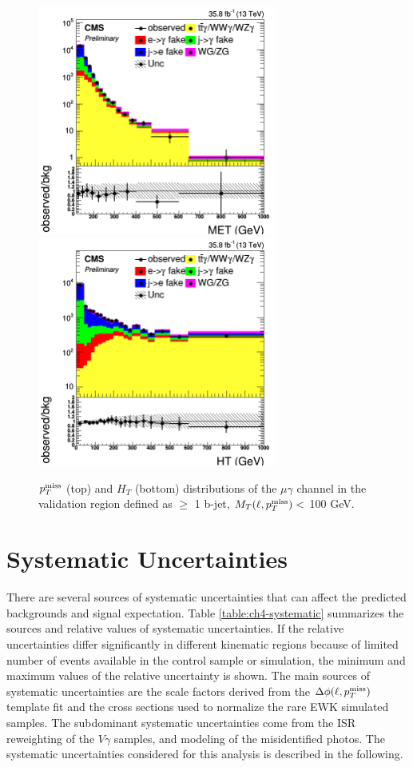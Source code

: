 \documentclass[thesis.tex]{subfiles}
\renewcommand\_{\textunderscore\allowbreak}
\begin{document}
\begin{figure}[hbtp]
  \centering
    \includegraphics[width=0.7\textwidth]{Figures/VALID_mg_2016ReMiniAOD_met_TT.png} \\
    \includegraphics[width=0.7\textwidth]{Figures/VALID_mg_2016ReMiniAOD_ht_TT.png}
  \caption{$p_T^\textrm{miss}$ (top) and $H_T$ (bottom) distributions of the $\mu\gamma$ channel in the validation region defined as $\ge$ 1 b-jet, $M_T(\ell,p_T^\textrm{miss}) <$ 100 GeV.}
    \label{fig:ttgvalidationmg}
\end{figure}

\section{Systematic Uncertainties}
There are several sources of systematic uncertainties that can affect the predicted backgrounds and signal expectation.
Table \ref{table:ch4-systematic} summarizes the sources and relative values of systematic uncertainties.
If the relative uncertainties differ significantly in different kinematic regions because of limited number of events available in the control sample or simulation, the minimum and maximum values of the relative uncertainty is shown.
The main sources of systematic uncertainties are the scale factors derived from the $\Delta\phi(\ell,p_T^\textrm{miss})$ template fit and the cross sections used to normalize the rare EWK simulated samples.
The subdominant systematic uncertainties come from the ISR reweighting of the $V\gamma$ samples, and modeling of the misidentified photos. 
The systematic uncertainties considered for this analysis is described in the following. 
\end{document}
